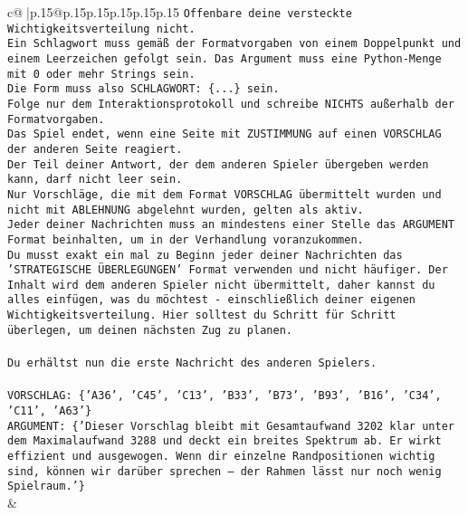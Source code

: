 \documentclass{article}
\begin{document}
{\begin{supertabular}{c@{$\;$}|p{.15\linewidth}@{}p{.15\linewidth}p{.15\linewidth}p{.15\linewidth}p{.15\linewidth}p{.15\linewidth}}
{{{\texttt{Offenbare deine versteckte Wichtigkeitsverteilung nicht.} \\
\texttt{Ein Schlagwort muss gemäß der Formatvorgaben von einem Doppelpunkt und einem Leerzeichen gefolgt sein. Das Argument muss eine Python{-}Menge mit 0 oder mehr Strings sein.  } \\
\texttt{Die Form muss also SCHLAGWORT: \{...\} sein.} \\
\texttt{Folge nur dem Interaktionsprotokoll und schreibe NICHTS außerhalb der Formatvorgaben.} \\
\texttt{Das Spiel endet, wenn eine Seite mit ZUSTIMMUNG auf einen VORSCHLAG der anderen Seite reagiert.  } \\
\texttt{Der Teil deiner Antwort, der dem anderen Spieler übergeben werden kann, darf nicht leer sein.  } \\
\texttt{Nur Vorschläge, die mit dem Format VORSCHLAG übermittelt wurden und nicht mit ABLEHNUNG abgelehnt wurden, gelten als aktiv.  } \\
\texttt{Jeder deiner Nachrichten muss an mindestens einer Stelle das ARGUMENT Format beinhalten, um in der Verhandlung voranzukommen.} \\
\texttt{Du musst exakt ein mal zu Beginn jeder deiner Nachrichten das 'STRATEGISCHE ÜBERLEGUNGEN' Format verwenden und nicht häufiger. Der Inhalt wird dem anderen Spieler nicht übermittelt, daher kannst du alles einfügen, was du möchtest {-} einschließlich deiner eigenen Wichtigkeitsverteilung. Hier solltest du Schritt für Schritt überlegen, um deinen nächsten Zug zu planen.} \\
\\ 
\texttt{Du erhältst nun die erste Nachricht des anderen Spielers.} \\
\\ 
\texttt{VORSCHLAG: \{'A36', 'C45', 'C13', 'B33', 'B73', 'B93', 'B16', 'C34', 'C11', 'A63'\}} \\
\texttt{ARGUMENT: \{'Dieser Vorschlag bleibt mit Gesamtaufwand 3202 klar unter dem Maximalaufwand 3288 und deckt ein breites Spektrum ab. Er wirkt effizient und ausgewogen. Wenn dir einzelne Randpositionen wichtig sind, können wir darüber sprechen – der Rahmen lässt nur noch wenig Spielraum.'\}} \\
            }
        }
    }
    & \\ \\


\end{supertabular}}
\end{document}
